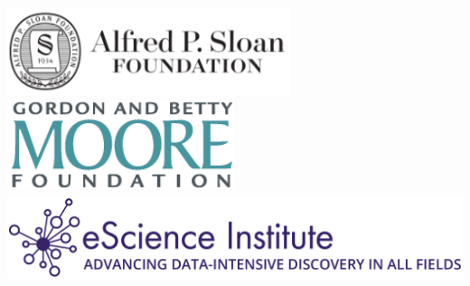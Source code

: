 \documentclass[a0, landscape]{a0poster}
\begin{document}
\begin{multicols}{3}
\includegraphics[height=2.6cm]{SloanLogo.png}
\includegraphics[height=2.6cm]{MooreFdn.png}
\includegraphics[height=2.6cm]{eSciencelogo.png}

\end{multicols}
\end{document}
